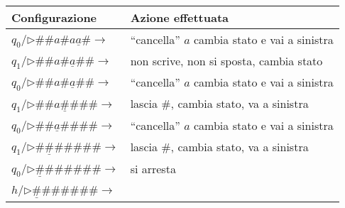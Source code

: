 \begin{table}[H]
    \centering
    \begin{tabular}{|l|l|}
        \hline
        Configurazione                                                & Azione effettuata                              \\\hline\hline
        $q_0$/$\triangleright \#\#a\#a\underline{a}\# \rightarrow$    & ``cancella'' $a$ cambia stato e vai a sinistra \\
        $q_1$/$\triangleright \#\#a\#\underline{a}\#\# \rightarrow$   & non scrive, non si sposta, cambia stato        \\
        $q_0$/$\triangleright \#\#a\#\underline{a}\#\# \rightarrow$   & ``cancella'' $a$ cambia stato e vai a sinistra \\
        $q_1$/$\triangleright \#\#a\underline{\#}\#\#\# \rightarrow$  & lascia \#, cambia stato, va a sinistra         \\
        $q_0$/$\triangleright \#\#\underline{a}\#\#\#\# \rightarrow$  & ``cancella'' $a$ cambia stato e vai a sinistra \\
        $q_1$/$\triangleright \#\underline{\#}\#\#\#\#\# \rightarrow$ & lascia \#, cambia stato, va a sinistra         \\
        $q_0$/$\triangleright \underline{\#}\#\#\#\#\#\# \rightarrow$ & si arresta                                     \\
        $h$/$\triangleright \underline{\#}\#\#\#\#\#\# \rightarrow$   &                                                \\\hline
    \end{tabular}
\end{table}

